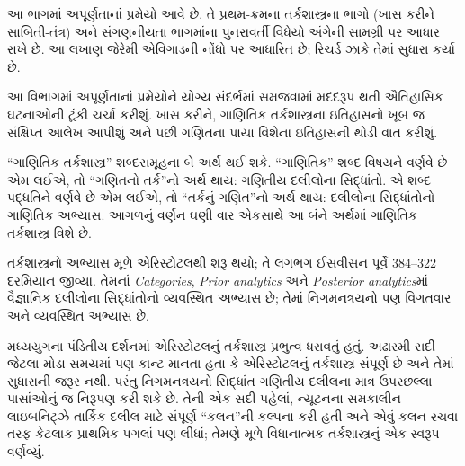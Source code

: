 
\label{guunit:OLP-0274}


\begin{editorial}
 આ ભાગમાં અપૂર્ણતાનાં પ્રમેયો આવે છે. તે પ્રથમ-ક્રમના
 તર્કશાસ્ત્રના ભાગો (ખાસ કરીને સાબિતી-તંત્ર) અને સંગણનીયતા
 ભાગમાંના પુનરાવર્તી વિધેયો અંગેની સામગ્રી પર આધાર રાખે છે.
 આ લખાણ જેરેમી એવિગાડની નોંધો પર આધારિત છે; રિચર્ડ ઝાકે
 તેમાં સુધારા કર્યા છે.
\end{editorial}

\begingroup
\makeatletter{}\makeatother

\label{guunit:OLP-0275}


\begingroup
\makeatletter{}\makeatother


\label{guunit:OLP-0276}


આ વિભાગમાં અપૂર્ણતાનાં પ્રમેયોને યોગ્ય સંદર્ભમાં સમજવામાં
મદદરૂપ થતી ઐતિહાસિક ઘટનાઓની ટૂંકી ચર્ચા કરીશું.
ખાસ કરીને, ગાણિતિક તર્કશાસ્ત્રના ઇતિહાસનો ખૂબ જ
સંક્ષિપ્ત આલેખ આપીશું અને પછી ગણિતના પાયા વિશેના
ઇતિહાસની થોડી વાત કરીશું.

\begin{digress}
  ``ગાણિતિક તર્કશાસ્ત્ર'' શબ્દસમૂહના બે અર્થ થઈ શકે.
  ``ગાણિતિક'' શબ્દ વિષયને વર્ણવે છે એમ લઈએ, તો
  ``ગણિતનો તર્ક''નો અર્થ થાય: ગણિતીય દલીલોના સિદ્ધાંતો.
  એ શબ્દ પદ્ધતિને વર્ણવે છે એમ લઈએ, તો ``તર્કનું ગણિત''નો
  અર્થ થાય: દલીલોના સિદ્ધાંતોનો ગાણિતિક અભ્યાસ.
  આગળનું વર્ણન ઘણી વાર એકસાથે આ બંને અર્થમાં ગાણિતિક
  તર્કશાસ્ત્ર વિશે છે.
\end{digress}

તર્કશાસ્ત્રનો અભ્યાસ મૂળે એરિસ્ટોટલથી શરૂ થયો; તે
લગભગ ઈસવીસન પૂર્વે 384--322 દરમિયાન જીવ્યા.
તેમનાં \emph{Categories}, \emph{Prior
  analytics} અને \emph{Posterior analytics}માં
વૈજ્ઞાનિક દલીલોના સિદ્ધાંતોનો વ્યવસ્થિત અભ્યાસ છે;
તેમાં નિગમનત્રયનો પણ વિગતવાર અને વ્યવસ્થિત અભ્યાસ છે.

મધ્યયુગના પંડિતીય દર્શનમાં એરિસ્ટોટલનું તર્કશાસ્ત્ર
પ્રભુત્વ ધરાવતું હતું. અઢારમી સદી જેટલા મોડા સમયમાં પણ
કાન્ટ માનતા હતા કે એરિસ્ટોટલનું તર્કશાસ્ત્ર સંપૂર્ણ છે
અને તેમાં સુધારાની જરૂર નથી. પરંતુ નિગમનત્રયનો સિદ્ધાંત
ગણિતીય દલીલના માત્ર ઉપરછલ્લા પાસાંઓનું જ નિરૂપણ કરી
શકે છે. તેની એક સદી પહેલાં, ન્યૂટનના સમકાલીન લાઇબનિટ્ઝે
તાર્કિક દલીલ માટે સંપૂર્ણ ``કલન''ની કલ્પના કરી હતી અને
એવું કલન રચવા તરફ કેટલાક પ્રાથમિક પગલાં પણ લીધાં;
તેમણે મૂળે વિધાનાત્મક તર્કશાસ્ત્રનું એક સ્વરૂપ વર્ણવ્યું.

